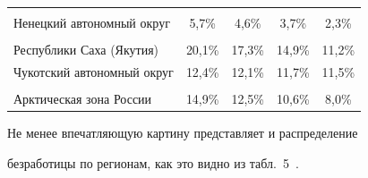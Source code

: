 \begin{table}
\begin{center}
\begin{tabular}{|l|c|c|c|c|}
&&&&\\[-9pt]


Ненецкий автономный округ &\hphantom{9}5,7\%&\hphantom{9}4,6\%&\hphantom{9}3,7\%&\hphantom{9}2,3\%\\


\hline


&&&&\\[-9pt]


Республики Саха (Якутия)&20,1\%&17,3\%&14,9\%&11,2\%\\


\hline


Чукотский автономный округ&12,4\%&12,1\%&11,7\%&11,5\%\\


\hline


&&&&\\[-9pt]


Арктическая зона России &14,9\%&12,5\%&10,6\%&\hphantom{9}8,0\%\\


\hline


\end{tabular}


\end{center}


\vspace*{-12pt}


\end{table}





    Не менее впечатляющую картину представляет и распределение


безработицы по регионам, как это видно из табл.~5~\cite{7-luc}.





